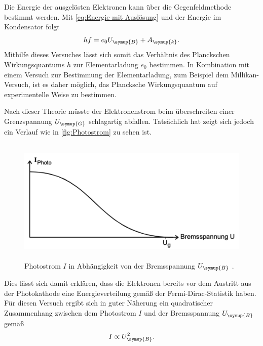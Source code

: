 Die Energie der ausgelösten Elektronen kann über die Gegenfeldmethode bestimmt werden. Mit \eqref{eq:Energie mit Auslösung} und der Energie
im Kondensator folgt
\begin{equation}
    hf = e_0U_{\symup{B}} + A_{\symup{k}}. \label{eq:Energie Photoelektronen}
\end{equation}
Mithilfe dieses Versuches lässt sich somit das Verhältnis des Planckschen Wirkungsquantums $h$ zur Elementarladung $e_0$ bestimmen. In Kombination
mit einem Versuch zur Bestimmung der Elementarladung, zum Beispiel dem Millikan-Versuch, ist es daher möglich, das Plancksche Wirkungsquantum 
auf experimentelle Weise zu bestimmen.

Nach dieser Theorie müsste der Elektronenstrom beim überschreiten einer Grenzspannung $U_{\symup{G}}$ schlagartig abfallen. Tatsächlich hat zeigt sich
jedoch ein Verlauf wie in \autoref{fig:Photostrom} zu sehen ist.
\begin{figure}
    \centering
    \includegraphics[height=6cm]{content/pics/Photostrom.pdf}
    \caption{Photostrom $I$ in Abhängigkeit von der Bremsspannung $U_{\symup{B}}$ \cite{v500}.}
    \label{fig:Photostrom}
\end{figure}
Dies lässt sich damit erklären, dass die Elektronen bereits vor dem Austritt aus der Photokathode eine Energieverteilung gemäß der
Fermi-Dirac-Statistik haben. Für diesen Versuch ergibt sich in guter Näherung ein quadratischer Zusammenhang zwischen dem Photostrom $I$ und
der Bremsspannung $U_{\symup{B}}$ gemäß
\begin{equation*}
    I \propto U_{\symup{B}}^2.
\end{equation*}
